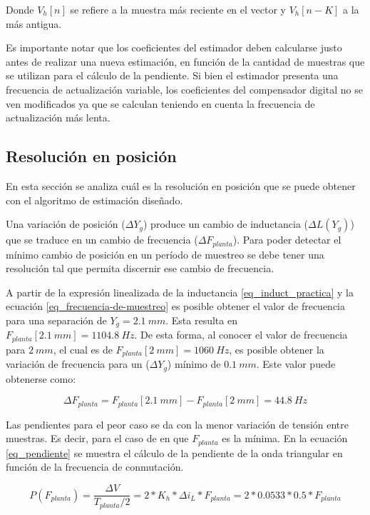 Donde $V_h[n]$ se refiere a la muestra más reciente en el vector y $V_h[n-K]$ a la más antigua.

Es importante notar que los coeficientes del estimador deben calcularse justo antes de realizar una nueva estimación,  en función de la cantidad de muestras que se utilizan para el cálculo de la pendiente. Si bien el estimador presenta una frecuencia de actualización variable, los coeficientes del compensador digital no se ven modificados ya que se calculan teniendo en cuenta la frecuencia de actualización más lenta.


\subsection{Resolución en posición}

En esta sección se analiza cuál es la resolución en posición que se puede obtener con el algoritmo de estimación diseñado.

Una variación de posición ($\Delta Y_g$) produce un cambio de inductancia ($\Delta L(Y_g)$) que se traduce en un cambio de frecuencia ($\Delta F_{planta}$). Para poder detectar el mínimo cambio de posición en un período de muestreo se debe tener una resolución tal que permita discernir ese cambio de frecuencia.


A partir de la expresión linealizada de la inductancia \ref{eq_induct_practica} y la ecuación \ref{eq_frecuencia-de-muestreo} es posible obtener el valor de frecuencia para una separación de $Y_g=2.1\:mm$. Esta resulta en $F_{planta}[2.1\:mm] = 1104.8\:Hz$. De esta forma, al conocer el valor de frecuencia para $2\:mm$, el cual es de $F_{planta}[2\:mm] = 1060\:Hz$, es posible obtener la variación de frecuencia para un ($\Delta Y_g$) mínimo de  $0.1\:mm$. Este valor puede obtenerse como:

\begin{equation} 
	\Delta F_{planta} = F_{planta}[2.1\:mm] - F_{planta}[2\:mm] = 44.8\:Hz
\end{equation}

 Las pendientes para el peor caso se da con la menor variación de tensión entre muestras. Es decir, para el caso de en que $F_{planta}$ es la mínima. En la ecuación \ref{eq_pendiente} se muestra el cálculo de la pendiente de la onda triangular en función de la frecuencia de conmutación.

\begin{equation} \label{eq_pendiente}
	P(F_{planta}) = \frac{\Delta V}{T_{planta}/2} = 2*K_h*\Delta i_L*F_{planta} = 2 * 0.0533 * 0.5 * F_{planta}
\end{equation}

